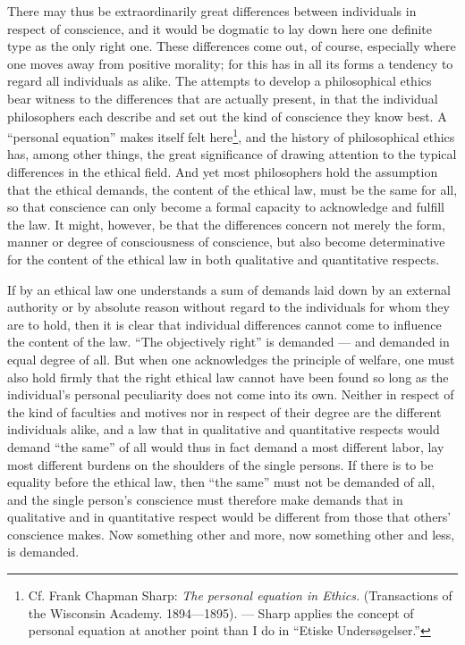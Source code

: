 \documentclass[12pt,a4paper,openany]{book}
\newcommand{\opage}[1]{\marginnote{\footnotesize\textit{[#1]}}}
\begin{document}
There may thus be extraordinarily great differences between individuals in respect of conscience, and it
would be dogmatic to lay down here one definite type as the only right one. These differences come out,
of course, especially
\opage{89}where one moves away from positive morality; for this has in all its forms a tendency to regard all
individuals as alike. The attempts to develop a philosophical ethics bear witness to the differences
that are actually present, in that the individual philosophers each describe and set out the kind of
conscience they know best. A ``personal equation'' makes itself felt here\footnote[1]{Cf. Frank Chapman
Sharp: \textit{The personal equation in Ethics.} (Transactions of the Wisconsin Academy.
1894---1895). --- Sharp applies the concept of personal equation at another point than I do in
``Etiske Undersøgelser.''}, and the history of philosophical ethics has, among other things, the great
significance of drawing attention to the typical differences in the ethical field. And yet most
philosophers hold the assumption that the ethical demands, the content of the ethical law, must be the
same for all, so that conscience can only become a formal capacity to acknowledge and fulfill the law.
It might, however, be that the differences concern not merely the form, manner or degree of
consciousness of conscience, but also become determinative for the content of the ethical law in both
qualitative and quantitative respects.

If by an ethical law one understands a sum of demands laid down by an external authority or by absolute
reason without regard to the individuals for whom they are to hold, then it is clear that individual
differences cannot come to influence the content of the law. ``The objectively right'' is demanded ---
and demanded in equal degree of all. But when one acknowledges the principle of welfare, one must also
hold firmly that the right ethical law cannot have been found so long as the individual's personal
peculiarity does not come into its own. Neither in respect of the kind of faculties and motives nor in
respect of their degree are the different individuals alike, and a law that in qualitative and
quantitative respects would demand ``the same'' of all would thus in fact demand a most different labor,
lay most different burdens on the shoulders of the single persons.
If there is to be equality before the ethical law, then ``the same'' must not be demanded of all, and
the single person's conscience must
\opage{90}therefore make demands that in qualitative and in quantitative respect would be different from those
that others' conscience makes. Now something other and more, now something other and less, is
demanded.
\end{document}
